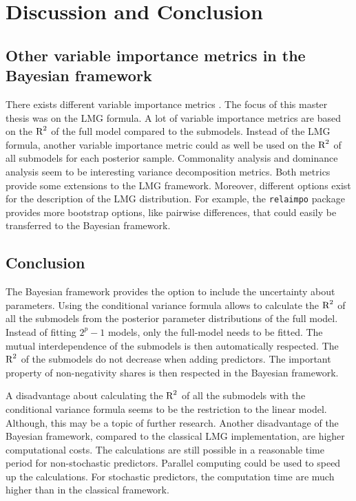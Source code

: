 \documentclass[11pt,a4paper,twoside]{book}\usepackage[]{graphicx}\usepackage[]{color}
\begin{document}






\chapter{Discussion and Conclusion}

\section{Other variable importance metrics in the Bayesian framework}

There exists different variable importance metrics \citep{Gromping2015}. The focus of this master thesis was on the LMG formula.  A lot of variable importance metrics are based on the $\text{R}^2$ of the full model compared to the submodels. Instead of the LMG formula, another variable importance metric could as well be used on the $\text{R}^2$ of all  submodels for each posterior sample. Commonality analysis \citep{Nimon2008} and dominance analysis \citep{Gromping2015} seem to be interesting variance decomposition metrics. Both metrics provide some extensions to the LMG framework. Moreover, different options exist for the description of the LMG distribution. For example, the \texttt{relaimpo} package provides more bootstrap options, like pairwise differences, that could easily be transferred to the Bayesian framework. 
 
\section{Conclusion}

The Bayesian framework provides the option to include the uncertainty about parameters.  Using  the conditional variance formula allows to calculate the $\text{R}^2$ of all the submodels from the posterior parameter distributions of the full model. Instead of fitting $2^{p}-1$ models, only the full-model needs to be fitted. The mutual interdependence of the submodels is then automatically respected. The $\text{R}^2$ of the submodels do not decrease when adding predictors. The important property of non-negativity shares is then respected in the Bayesian framework.

A disadvantage about calculating the $\text{R}^2$ of all the submodels with the conditional variance formula seems to be the restriction to the linear model. Although, this may be a topic of further research. Another disadvantage of the Bayesian framework, compared to the classical LMG implementation, are higher computational costs. The calculations are still possible in a reasonable time period for non-stochastic predictors. Parallel computing could be used to speed up the calculations. For stochastic predictors, the computation time are much higher than in the classical framework.
\end{document}
